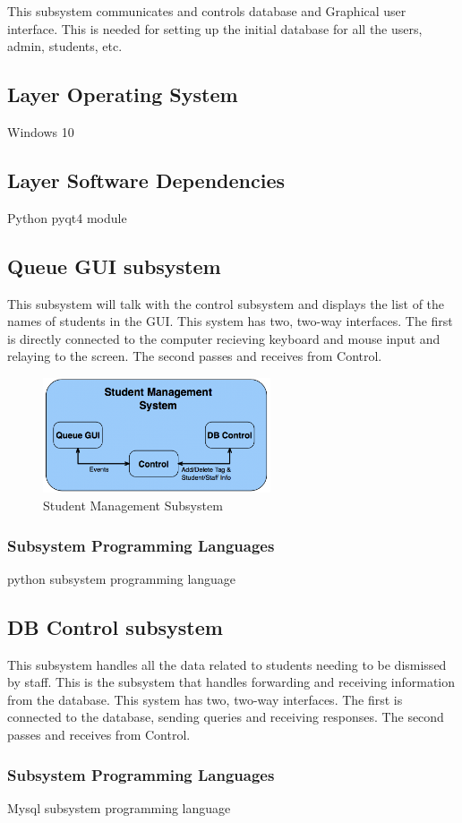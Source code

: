 This subsystem communicates and controls database and Graphical user interface. This is needed
for setting up the initial database for all the users, admin, students, etc.

\subsection{Layer Operating System}
Windows 10

\subsection{Layer Software Dependencies}
Python pyqt4 module 

\subsection{Queue GUI subsystem}
This subsystem will talk with the control subsystem and displays the list of the names of students
in the GUI. This system has two, two-way interfaces. The first is directly connected to the computer recieving
keyboard and mouse input and relaying to the screen. The second passes and receives from Control.

\begin{figure}[h!]
	\centering
 	\includegraphics[width=0.60\textwidth]{images/ads_3}
 \caption{Student Management Subsystem}
\end{figure}


\subsubsection{Subsystem Programming Languages}
python subsystem programming language

\subsection{DB Control subsystem}
This subsystem handles all the data related to students needing to be dismissed by staff. This is the
subsystem that handles forwarding and receiving information from the database. This system has two, two-way interfaces. The first is connected to the database, sending queries and receiving responses. The second passes and receives from Control.


\subsubsection{Subsystem Programming Languages}
Mysql subsystem programming language




